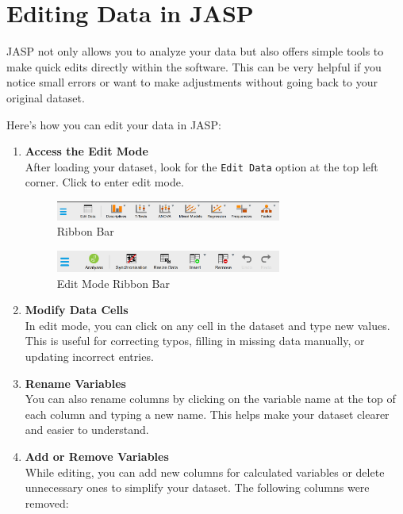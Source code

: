\section{Editing Data in JASP}

JASP not only allows you to analyze your data but also offers simple tools to make quick edits directly within the software. This can be very helpful if you notice small errors or want to make adjustments without going back to your original dataset.

Here’s how you can edit your data in JASP:

\begin{enumerate}
    \item \textbf{Access the Edit Mode} \\
    After loading your dataset, look for the \texttt{Edit Data} option at the top left corner. Click to enter edit mode.

\begin{figure}[h]
\centering
\includegraphics[width=0.7\textwidth]{figures/edit option.png}
\caption{Ribbon Bar}
\end{figure}

\begin{figure}[h]
\centering
\includegraphics[width=0.7\textwidth]{figures/edit mode.png}
\caption{Edit Mode Ribbon Bar}
\end{figure}

    \item \textbf{Modify Data Cells} \\
    In edit mode, you can click on any cell in the dataset and type new values. This is useful for correcting typos, filling in missing data manually, or updating incorrect entries.

    \item \textbf{Rename Variables} \\
    You can also rename columns by clicking on the variable name at the top of each column and typing a new name. This helps make your dataset clearer and easier to understand.

    \item \textbf{Add or Remove Variables} \\
    While editing, you can add new columns for calculated variables or delete unnecessary ones to simplify your dataset.
    The following columns were removed:


\end{enumerate}
